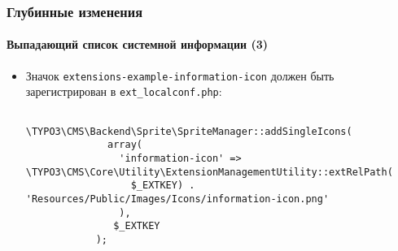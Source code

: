 \begin{frame}[fragile]
	\frametitle{Глубинные изменения}
	\framesubtitle{Выпадающий список системной информации (3)}

	\lstset{basicstyle=\tiny\ttfamily}

	\begin{itemize}
		\item Значок \texttt{extensions-example-information-icon} должен быть зарегистрирован в \texttt{ext\_localconf.php}:
		\begin{lstlisting}
			\TYPO3\CMS\Backend\Sprite\SpriteManager::addSingleIcons(
			  array(
			    'information-icon' => \TYPO3\CMS\Core\Utility\ExtensionManagementUtility::extRelPath(
			      $_EXTKEY) . 'Resources/Public/Images/Icons/information-icon.png'
			    ),
			   $_EXTKEY
			);
		\end{lstlisting}

	\end{itemize}

\end{frame}


